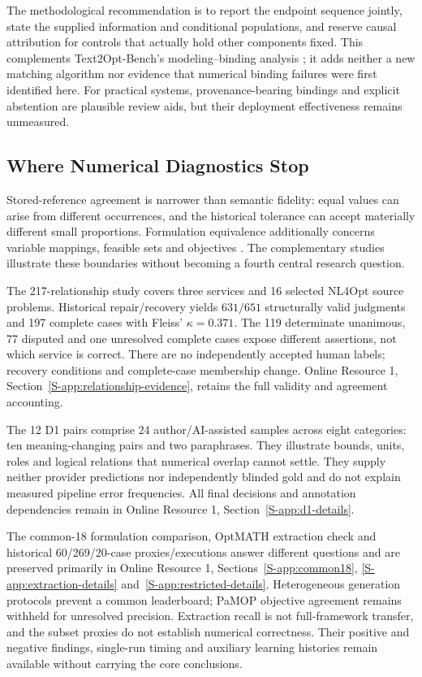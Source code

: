 \documentclass[pdflatex,iicol,sn-basic,Numbered]{sn-jnl}
\begin{document}
The methodological recommendation is to report the endpoint sequence jointly, state the supplied information and conditional populations, and reserve causal attribution for controls that actually hold other components fixed. This complements Text2Opt-Bench's modeling--binding analysis \cite{gao2026models}; it adds neither a new matching algorithm nor evidence that numerical binding failures were first identified here. For practical systems, provenance-bearing bindings and explicit abstention are plausible review aids, but their deployment effectiveness remains unmeasured.

\subsection{Where Numerical Diagnostics Stop}
\label{sec:llm}\label{subsec:numerical-grounding-challenges}
Stored-reference agreement is narrower than semantic fidelity: equal values can arise from different occurrences, and the historical tolerance can accept materially different small proportions. Formulation equivalence additionally concerns variable mappings, feasible sets and objectives \cite{zhai2025equivamap}. The complementary studies illustrate these boundaries without becoming a fourth central research question.

\label{subsec:relationship-audit}
The 217-relationship study covers three services and 16 selected NL4Opt source problems. Historical repair/recovery yields $631/651$ structurally valid judgments and 197 complete cases with Fleiss' $\kappa=0.371$. The 119 determinate unanimous, 77 disputed and one unresolved complete cases expose different assertions, not which service is correct. There are no independently accepted human labels; recovery conditions and complete-case membership change. Online Resource 1, Section~\ref{S-app:relationship-evidence}, retains the full validity and agreement accounting.

\label{subsec:d1}
The 12 D1 pairs comprise 24 author/AI-assisted samples across eight categories: ten meaning-changing pairs and two paraphrases. They illustrate bounds, units, roles and logical relations that numerical overlap cannot settle. They supply neither provider predictions nor independently blinded gold and do not explain measured pipeline error frequencies. All final decisions and annotation dependencies remain in Online Resource 1, Section~\ref{S-app:d1-details}.


The common-18 formulation comparison, OptMATH extraction check and historical 60/269/20-case proxies/executions answer different questions and are preserved primarily in Online Resource 1, Sections~\ref{S-app:common18}, \ref{S-app:extraction-details} and~\ref{S-app:restricted-details}. Heterogeneous generation protocols prevent a common leaderboard; PaMOP objective agreement remains withheld for unresolved precision. Extraction recall is not full-framework transfer, and the subset proxies do not establish numerical correctness. Their positive and negative findings, single-run timing and auxiliary learning histories remain available without carrying the core conclusions.
\end{document}
